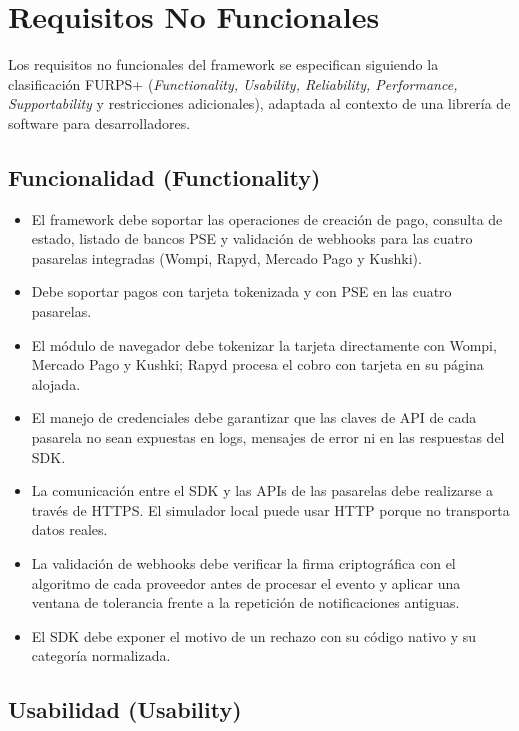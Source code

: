 \section{Requisitos No Funcionales}

Los requisitos no funcionales del framework se especifican siguiendo la clasificación FURPS+ (\textit{Functionality, Usability, Reliability, Performance, Supportability} y restricciones adicionales), adaptada al contexto de una librería de software para desarrolladores.

\subsection{Funcionalidad (Functionality)}

\begin{itemize}
  \item El framework debe soportar las operaciones de creación de pago, consulta de estado, listado de bancos PSE y validación de webhooks para las cuatro pasarelas integradas (Wompi, Rapyd, Mercado Pago y Kushki).
  \item Debe soportar pagos con tarjeta tokenizada y con PSE en las cuatro pasarelas.
  \item El módulo de navegador debe tokenizar la tarjeta directamente con Wompi, Mercado Pago y Kushki; Rapyd procesa el cobro con tarjeta en su página alojada.
  \item El manejo de credenciales debe garantizar que las claves de API de cada pasarela no sean expuestas en logs, mensajes de error ni en las respuestas del SDK.
  \item La comunicación entre el SDK y las APIs de las pasarelas debe realizarse a través de HTTPS. El simulador local puede usar HTTP porque no transporta datos reales.
  \item La validación de webhooks debe verificar la firma criptográfica con el algoritmo de cada proveedor antes de procesar el evento y aplicar una ventana de tolerancia frente a la repetición de notificaciones antiguas.
  \item El SDK debe exponer el motivo de un rechazo con su código nativo y su categoría normalizada.
\end{itemize}

\subsection{Usabilidad (Usability)}

